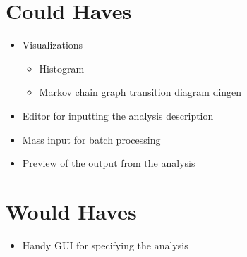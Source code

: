 \documentclass[a4paper]{article}
\begin{document}
\section{Could Haves}
\begin{itemize}
  \item Visualizations
  \begin{itemize}
	  \item Histogram
      \item Markov chain graph transition diagram dingen
  \end{itemize}
  \item Editor for inputting the analysis description
  \item Mass input for batch processing
  \item Preview of the output from the analysis
\end{itemize}

\section{Would Haves}
\begin{itemize}
	\item Handy GUI for specifying the analysis
\end{itemize}
\end{document}
